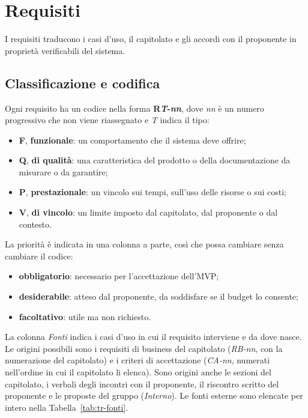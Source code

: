 \documentclass[documento]{gpt}
\begin{document}
\section{Requisiti}\label{sec:requisiti}

I requisiti traducono i casi d'uso, il capitolato e gli accordi con il
proponente in proprietà verificabili del sistema.

\subsection{Classificazione e codifica}
Ogni requisito ha un codice nella forma \textbf{R\textit{T}-\textit{nn}}, dove
\textit{nn} è un numero progressivo che non viene riassegnato e \textit{T} indica
il tipo:
\begin{itemize}
  \item \textbf{F}, \textbf{funzionale}: un comportamento che il sistema deve
        offrire;
  \item \textbf{Q}, \textbf{di qualità}: una caratteristica del prodotto o della
        documentazione da misurare o da garantire;
  \item \textbf{P}, \textbf{prestazionale}: un vincolo sui tempi, sull'uso delle
        risorse o sui costi;
  \item \textbf{V}, \textbf{di vincolo}: un limite imposto dal capitolato, dal
        proponente o dal contesto.
\end{itemize}
La priorità è indicata in una colonna a parte, così che possa cambiare senza
cambiare il codice:
\begin{itemize}
  \item \textbf{obbligatorio}: necessario per l'accettazione dell'MVP;
  \item \textbf{desiderabile}: atteso dal proponente, da soddisfare se il budget
        lo consente;
  \item \textbf{facoltativo}: utile ma non richiesto.
\end{itemize}
La colonna \textit{Fonti} indica i casi d'uso in cui il requisito interviene e
da dove nasce. Le origini possibili sono i requisiti di business del capitolato
(\textit{RB-nn}, con la numerazione del capitolato) e i criteri di accettazione
(\textit{CA-nn}, numerati nell'ordine in cui il capitolato li elenca). Sono
origini anche le sezioni del capitolato, i verbali degli incontri con il
proponente, il riscontro scritto del proponente e le proposte del gruppo
(\textit{Interno}). Le fonti esterne
sono elencate per intero nella Tabella~\ref{tab:tr-fonti}.
\end{document}
